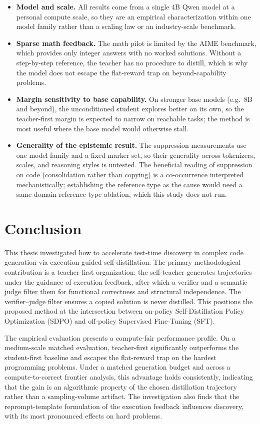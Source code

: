 \documentclass[12pt,a4paper]{report}
\providecommand{\tightlist}{\setlength{\itemsep}{0pt}\setlength{\parskip}{0pt}}
\begin{document}
\begin{itemize}
\tightlist
\item
  \textbf{Model and scale.} All results come from a single 4B Qwen model at a personal compute scale, so they are an empirical characterization within one model family rather than a scaling law or an industry-scale benchmark.
\item
  \textbf{Sparse math feedback.} The math pilot is limited by the AIME benchmark, which provides only integer answers with no worked solutions. Without a step-by-step reference, the teacher has no procedure to distill, which is why the model does not escape the flat-reward trap on beyond-capability problems.
\item
  \textbf{Margin sensitivity to base capability.} On stronger base models (e.g.\ 8B and beyond), the unconditioned student explores better on its own, so the teacher-first margin is expected to narrow on reachable tasks; the method is most useful where the base model would otherwise stall.
\item
  \textbf{Generality of the epistemic result.} The suppression measurements use one model family and a fixed marker set, so their generality across tokenizers, scales, and reasoning styles is untested. The beneficial reading of suppression on code (consolidation rather than copying) is a co-occurrence interpreted mechanistically; establishing the reference type as the cause would need a same-domain reference-type ablation, which this study does not run.
\end{itemize}

\chapter{Conclusion}\label{chapter-7-conclusion}

This thesis investigated how to accelerate test-time discovery in complex code generation via execution-guided self-distillation. The primary methodological contribution is a teacher-first organization: the self-teacher generates trajectories under the guidance of execution feedback, after which a verifier and a semantic judge filter them for functional correctness and structural independence. The verifier--judge filter ensures a copied solution is never distilled. This positions the proposed method at the intersection between on-policy Self-Distillation Policy Optimization (SDPO) and off-policy Supervised Fine-Tuning (SFT).

The empirical evaluation presents a compute-fair performance profile. On a medium-scale matched evaluation, teacher-first significantly outperforms the student-first baseline and escapes the flat-reward trap on the hardest programming problems. Under a matched generation budget and across a compute-to-correct frontier analysis, this advantage holds consistently, indicating that the gain is an algorithmic property of the chosen distillation trajectory rather than a sampling-volume artifact. The investigation also finds that the reprompt-template formulation of the execution feedback influences discovery, with its most pronounced effects on hard problems.
\end{document}
